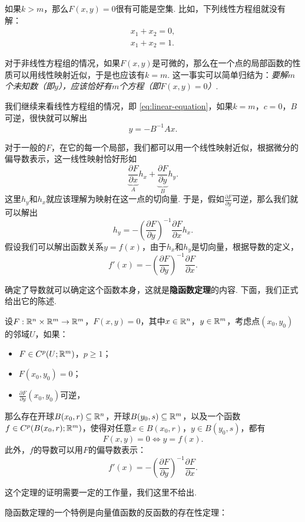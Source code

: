 如果$k>m$，那么$F(x,y)=0$很有可能是空集. 比如，下列线性方程组就没有解：
\begin{gather*}
    x_1+x_2=0, \\
    x_1+x_2=1.
\end{gather*}

对于非线性方程组的情况，如果$F(x,y)$是可微的，那么在一个点的局部函数的性质可以用线性映射近似，于是也应该有$k=m$. 这一事实可以简单归结为：\textit{要解$m$个未知数（即$y$），应该恰好有$m$个方程（即$F(x,y)=0$）}.

我们继续来看线性方程组的情况，即 \eqref{eq:linear-equation}，如果$k=m$，$c=0$，$B$可逆，很快就可以解出
\[y=-B^{-1}Ax.\]

对于一般的$F$，在它的每一个局部，我们都可以用一个线性映射近似，根据微分的偏导数表示，这一线性映射恰好形如
\[\underbrace{\frac{\partial F}{\partial x}}_A h_x+\underbrace{\frac{\partial F}{\partial y}}_B h_y.\]
这里$h_y$和$h_x$就应该理解为映射在这一点的切向量. 
于是，假如$\frac{\partial F}{\partial y}$可逆，那么我们就可以解出
\[h_y=-\left(\frac{\partial F}{\partial y}\right)^{-1}\frac{\partial F}{\partial x}h_x.\]
假设我们可以解出函数关系$y=f(x)$，由于$h_x$和$h_y$是切向量，根据导数的定义，
\[f'(x)=-\left(\frac{\partial F}{\partial y}\right)^{-1}\frac{\partial F}{\partial x}.\]

确定了导数就可以确定这个函数本身，这就是\textbf{隐函数定理}的内容. 下面，我们正式给出它的陈述. 

\begin{theorem}[隐函数定理]\label{theorem:implicit-function}
    设$F:\mathbb{R}^n\times\mathbb{R}^m\to\mathbb{R}^m$，$F(x,y)=0$，其中$x\in\mathbb{R}^n$，$y\in\mathbb{R}^m$，考虑点$(x_0,y_0)$的邻域$U$，如果：
    \begin{itemize}
        \item $F\in C^p(U;\mathbb{R}^m)$，$p\geq 1$；
        \item $F(x_0,y_0)=0$；
        \item $\frac{\partial F}{\partial y}(x_0,y_0)$可逆，
    \end{itemize}
    那么存在开球$B(x_0,r)\subseteq\mathbb{R}^n$，开球$B(y_0,s)\subseteq\mathbb{R}^m$，以及一个函数$f\in C^p(B(x_0,r);\mathbb{R}^m)$，使得对任意$x\in B(x_0,r)$，$y\in B(y_0,s)$，都有
    \[F(x,y)=0\iff y=f(x).\]
    此外，$f$的导数可以用$F$的偏导数表示：
    \[f'(x)=-\left(\frac{\partial F}{\partial y}\right)^{-1}\frac{\partial F}{\partial x}.\]
\end{theorem}

这个定理的证明需要一定的工作量，我们这里不给出.

隐函数定理的一个特例是向量值函数的反函数的存在性定理：

